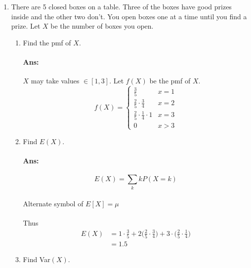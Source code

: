 \documentclass[letterpaper,12pt]{article}
\begin{document}
\begin{enumerate}
    \item There are 5 closed boxes on a table. Three of the boxes have good prizes inside and the
other two don’t. You open boxes one at a time until you find a prize. Let $X$ be the
number of boxes you open.
    \begin{enumerate}[label=(\alph*).]
        \item Find the pmf of $X$.
            \paragraph{Ans:} $X$ may take values $\in [1,3]$. Let $f(X)$ be the pmf of $X$.
            \[ f(X) = \begin{cases}
                \frac{3}{5}& x = 1\\
                \frac{2}{5}\cdot\frac{3}{4}& x = 2 \\
                \frac{2}{5} \cdot \frac{1}{4} \cdot 1 & x = 3 \\
                0 & x > 3
                \end{cases}
            \]
        \item Find $E(X)$.
            \paragraph{Ans:} 
            \begin{equation}
                E(X) = \sum_k k P(X=k)
            \end{equation}
            \paragraph{}Alternate symbol of $E[X] = \mu$
            \paragraph{}Thus
            \begin{align*}
                E(X) &= 1\cdot\frac{3}{5} + 2\bigg(\frac{2}{5}\cdot \frac{3}{4}\bigg) + 3\cdot\bigg(\frac{2}{5} \cdot \frac{1}{4}\bigg)\\
                     &= 1.5
            \end{align*}
        \item Find Var$(X)$.

\end{enumerate}
\end{enumerate}
\end{document}
